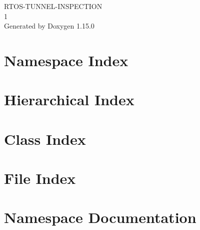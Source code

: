 \documentclass[twoside]{book}
\newcommand{\+}{\discretionary{\mbox{\scriptsize$\hookleftarrow$}}{}{}}
\newcommand{\clearemptydoublepage}{%
    \newpage{\pagestyle{empty}\cleardoublepage}%
  }
\begin{document}
  \raggedbottom
    \hypersetup{pageanchor=false,
                bookmarksnumbered=true,
                pdfencoding=unicode
               }
  \begin{titlepage}
  \vspace*{7cm}
  \begin{center}%
  {\Large RTOS-\/\+TUNNEL-\/\+INSPECTION}\\
  [1ex]\large 1 \\
  \vspace*{1cm}
  {\large Generated by Doxygen 1.15.0}\\
  \end{center}
  \end{titlepage}
  \clearemptydoublepage
  \tableofcontents
  \clearemptydoublepage
  \hypersetup{pageanchor=true}
\chapter{Namespace Index}

\chapter{Hierarchical Index}

\chapter{Class Index}

\chapter{File Index}

\chapter{Namespace Documentation}























\end{document}
